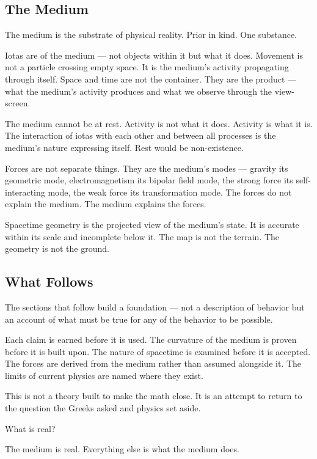 \documentclass[11pt]{article}
\begin{document}
\subsection{The Medium}
\label{sec:org86c3bb6}

The medium is the substrate of physical reality. Prior in kind. One substance.

Iotas are of the medium — not objects within it but what it does. Movement is not
a particle crossing empty space. It is the medium's activity propagating through
itself. Space and time are not the container. They are the product — what the
medium's activity produces and what we observe through the view-screen.

The medium cannot be at rest. Activity is not what it does. Activity is what it
is. The interaction of iotas with each other and between all processes is the
medium's nature expressing itself. Rest would be non-existence.

Forces are not separate things. They are the medium's modes — gravity its
geometric mode, electromagnetism its bipolar field mode, the strong force its
self-interacting mode, the weak force its transformation mode. The forces do not
explain the medium. The medium explains the forces.

Spacetime geometry is the projected view of the medium's state. It is accurate
within its scale and incomplete below it. The map is not the terrain. The
geometry is not the ground.

\subsection{What Follows}
\label{sec:orgba24306}

The sections that follow build a foundation — not a description of behavior but
an account of what must be true for any of the behavior to be possible.

Each claim is earned before it is used. The curvature of the medium is proven
before it is built upon. The nature of spacetime is examined before it is
accepted. The forces are derived from the medium rather than assumed alongside
it. The limits of current physics are named where they exist.

This is not a theory built to make the math close. It is an attempt to return to
the question the Greeks asked and physics set aside.

What is real?

The medium is real. Everything else is what the medium does.
\end{document}
